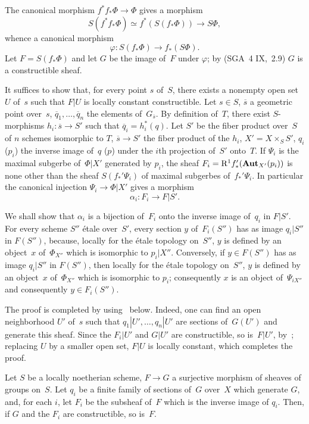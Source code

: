 The canonical morphism $f^*f_*\Phi\to\Phi$ gives a morphism
$$
S(f^*f_*\Phi )\simeq f^*(S(f_*\Phi ))\to S\Phi ,
$$
whence a canonical morphism
$$
\varphi\colon S(f_*\Phi )\to f_*(S\Phi ).
$$
Let
$F=S(f_*\Phi )$ and let $G$ be the image of~$F$ under $\varphi$; by
(SGA~4 IX,~2.9) $G$ is a constructible sheaf.

It suffices to show that, for every point $s$ of~$S$, there exists a
nonempty open set~$U$ of~$s$ such that $F|U$ is locally constant
constructible. Let $s\in S$, $\overline{s}$ a geometric
point over~$s$, $\overline{q}_1,\dots,\overline{q}_n$ the elements of~$G_{\overline{s}}$. By
definition of~$T$, there exist $S$-morphisms
$h_i\colon\overline{s}\to S'$ such that
$\overline{q}_i=h_i^*(q)$. Let $S'$ be the fiber product over~$S$ of
$n$ schemes isomorphic to $T$, $\overline{s}\to S'$ the fiber
product of the $h_i$, $X'=X\times_SS'$, $q_i$ (\resp $p_i$) the inverse
image of~$q$ (\resp $p$) under the $i$th projection of~$S'$ onto~$T$. If $\Psi_i$ is the maximal subgerbe of~$\Phi|X'$
generated by $p_i$, the sheaf
$F_i=\mathrm{R}^1f_*'(\operatorname{\mathbf{Aut}}_{X'}(p_i))$ is none other than the sheaf
$S(f_*'\Psi_i)$ of maximal subgerbes of~$f_*'\Psi_i$. In
particular the canonical injection $\Psi_i\to\Phi |X'$ gives a
morphism
$$
\alpha_i\colon F_i\to F|S'.
$$

We shall show that $\alpha_i$ is a bijection of~$F_i$ onto
the inverse image of~$q_i$ in $F|S'$. For every scheme $S''$
\'etale over~$S'$, every section $y$ of~$F_i(S'')$ has as image
$q_i|S''$ in $F(S'')$, because, locally for the \'etale topology
on~$S''$, $y$ is defined by an object~$x$ of~$\Phi_{X''}$ which is
isomorphic to $p_i|X''$. Conversely, if $y\in F(S'')$ has as
image $q_i|S''$ in $F(S'')$, then locally for the \'etale topology
on~$S''$, $y$ is defined by an object~$x$ of~$\Phi_{X''}$ which is
isomorphic to $p_i$; consequently $x$ is an object of~$\Psi_{iX''}$ and
consequently $y\in F_i(S'')$.

The proof is completed by using~
below. Indeed, one can find an open neighborhood $U'$ of~$s$
such that $q_1|U',\dots,q_n|U'$ are sections of~$G(U')$ and
generate this sheaf. Since the $F_i|U'$ and $G|U'$ are
constructible, so is~$F|U'$,
by~; replacing $U$ by a smaller
open set, $F|U$ is locally constant, which completes the
proof.

\begin{sublemma}
\label{XIII.6.1.2}
Let
$S$ be a locally noetherian scheme, $F\to G$ a surjective
morphism of sheaves of groups on~$S$. Let $q_i$ be a
finite family of sections of~$G$ over~$X$ which generate $G$, and, for
each $i$, let $F_i$ be the subsheaf of~$F$ which is the inverse image of
$q_i$. Then, if $G$ and the $F_i$ are constructible, so is~$F$.
\end{sublemma}

